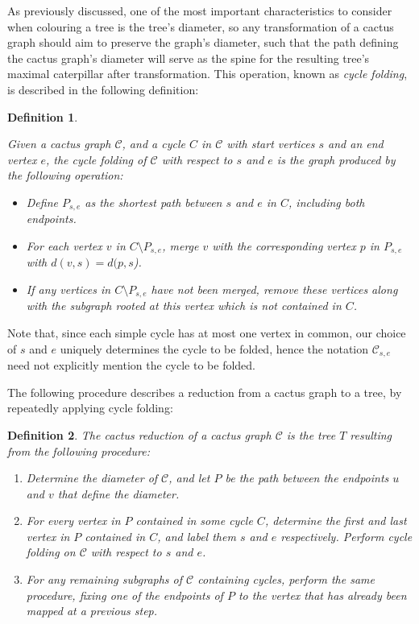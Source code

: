 \documentclass{mpaper}
\newtheorem{definition}{Definition}[section]
\begin{document}
As previously discussed, one of the most important characteristics to consider when colouring a tree is the tree's diameter, so any transformation of a cactus graph should aim to preserve the graph's diameter, such that the path defining the cactus graph's diameter will serve as the spine for the resulting tree's maximal caterpillar after transformation. This operation, known as \emph{cycle folding}, is described in the following definition:

\begin{definition}
\label{def/cycle-folding}


Given a cactus graph $\mathcal{C}$, and a cycle $C$ in $\mathcal{C}$ with start vertices $s$ and an end vertex $e$, the \emph{cycle folding} of $\mathcal{C}$ with respect to $s$ and $e$ is the graph produced by the following operation:

\begin{itemize}
  \item Define $P_{s,e}$ as the shortest path between $s$ and $e$ in $C$, including both endpoints.
  \item For each vertex $v$ in $C \setminus P_{s,e}$, merge $v$ with the corresponding vertex $p$ in $P_{s,e}$ with $d(v,s) = d(p,s$).
  \item If any vertices in $C \setminus P_{s,e}$ have not been merged, remove these vertices along with the subgraph rooted at this vertex which is not contained in $C$.
\end{itemize}

\end{definition}

Note that, since each simple cycle has at most one vertex in common, our choice of $s$ and $e$ uniquely determines the cycle to be folded, hence the notation $\mathcal{C}_{s,e}$ need not explicitly mention the cycle to be folded.

The following procedure describes a reduction from a cactus graph to a tree, by repeatedly applying cycle folding:

\begin{definition}
  The \emph{cactus reduction} of a cactus graph $\mathcal{C}$ is the tree $T$ resulting from the following procedure:

  \begin{enumerate}
    \item Determine the diameter of $\mathcal{C}$, and let $P$ be the path between the endpoints $u$ and $v$ that define the diameter.
    \item For every vertex in $P$ contained in some cycle $C$, determine the first and last vertex in $P$ contained in $C$, and label them $s$ and $e$ respectively. Perform cycle folding on $\mathcal{C}$ with respect to $s$ and $e$.
    \item For any remaining subgraphs of $\mathcal{C}$ containing cycles, perform the same procedure, fixing one of the endpoints of $P$ to the vertex that has already been mapped at a previous step.
  \end{enumerate}
\end{definition}
\end{document}

